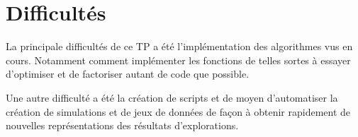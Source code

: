 \section{Difficultés}

La principale difficultés de ce TP a été l'implémentation des algorithmes vus en cours.
Notamment comment implémenter les fonctions de telles sortes à essayer d'optimiser et de factoriser
autant de code que possible.

Une autre difficulté a été la création de scripts et de moyen d'automatiser la création de simulations
et de jeux de données de façon à obtenir rapidement de nouvelles représentations des résultats d'explorations.
